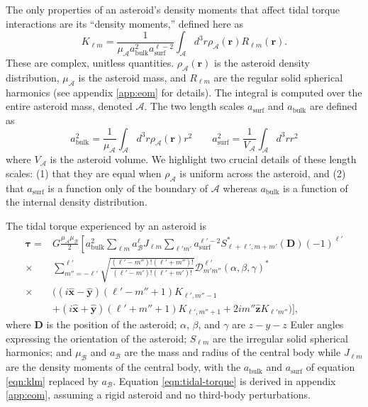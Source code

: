 \documentclass[fleqn,usenatbib]{mnras}
\newcommand{\unit}[1]{\bm{\hat{#1}}}
\begin{document}
The only properties of an asteroid's density moments that affect tidal torque interactions are its ``density moments,'' defined here as
\begin{equation}
  K_{\ell m} = \frac{1}{\mu_\mathcal{A} a_\text{bulk}^2 a_\text{surf}^{\ell - 2}} \int_\mathcal{A} d^3 r \rho_\mathcal{A}(\bm r) R_{\ell m}(\bm r).
  \label{eqn:klm}
\end{equation}
These are complex, unitless quantities. $\rho_\mathcal{A}(\bm r)$ is the asteroid density distribution, $\mu_\mathcal{A}$ is the asteroid mass, and $R_{\ell m}$ are the regular solid spherical harmonics (see appendix \ref{app:eom} for details). The integral is computed over the entire asteroid mass, denoted $\mathcal{A}$. The two length scales $a_\text{surf}$ and $a_\text{bulk}$ are defined as 
\begin{equation}
  a_\text{bulk}^2 = \frac{1}{\mu_\mathcal{A}} \int_\mathcal{A} d^3 r \rho_\mathcal{A}(\bm r) r^2 \qquad
  a_\text{surf}^2 = \frac{1}{V_\mathcal{A}} \int_\mathcal{A} d^3 r r^2
  \label{eqn:am}
\end{equation}
where $V_\mathcal{A}$ is the asteroid volume. We highlight two crucial details of these length scales: (1) that they are equal when $\rho_\mathcal{A}$ is uniform across the asteroid, and (2) that $a_\text{surf}$ is a function only of the boundary of $\mathcal{A}$ whereas $a_\text{bulk}$ is a function of the internal density distribution.

The tidal torque experienced by an asteroid is 
\begin{equation}
  \begin{split}
  \bm \tau = & G\frac{\mu_\mathcal{A}\mu_\mathcal{B}}{2}\left[a_\text{bulk}^2 \sum_{\ell m} a_\mathcal{B}^\ell J_{\ell m} \sum_{\ell' m'}a_\text{surf}^{\ell' - 2}S^*_{\ell+\ell', m + m'} (\bm D) (-1)^{\ell'}\right.\\
  \times & \left.\sum_{m''=-\ell'}^{\ell'} \sqrt{\frac{(\ell'-m'')!(\ell'+m'')!}{(\ell'-m')!(\ell'+m')!}}  \mathcal{D}^{\ell'}_{m'm''}(\alpha, \beta, \gamma)^* \right. \\
  \times & \Big((i\unit x - \unit y)(\ell'-m''+1)K_{\ell',m''-1} \\
  & +(i\unit x+\unit y)(\ell'+m''+1)K_{\ell',m''+1}+2im''\unit z K_{\ell'm''}\Big) \Bigg],
  \end{split}
  \label{eqn:tidal-torque}
\end{equation}
where $\bm D$ is the position of the asteroid; $\alpha$, $\beta$, and $\gamma$ are $z-y-z$ Euler angles expressing the orientation of the asteroid; $S_{\ell m}$ are the irregular solid spherical harmonics; and $\mu_\mathcal{B}$ and $a_\mathcal{B}$ are the mass and radius of the central body while $J_{\ell m}$ are the density moments of the central body, with the $a_\text{bulk}$ and $a_\text{surf}$ of equation \ref{eqn:klm} replaced by $a_\mathcal{B}$. Equation \ref{eqn:tidal-torque} is derived in appendix \ref{app:eom}, assuming a rigid asteroid and no third-body perturbations. 
\end{document}
